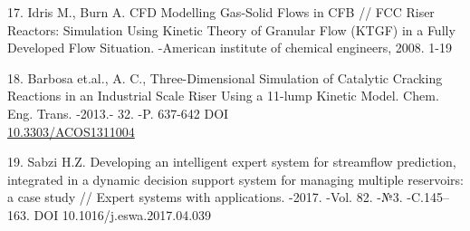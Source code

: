 \begin{references}
17. Idris M., Burn A. CFD Modelling Gas-Solid Flows in CFB // FCC Riser
Reactors: Simulation Using Kinetic Theory of Granular Flow (KTGF) in a
Fully Developed Flow Situation. -American institute of chemical
engineers, 2008. 1-19

18. Barbosa et.al., A. C., Three-Dimensional Simulation of Catalytic
Cracking Reactions in an Industrial Scale Riser Using a 11-lump Kinetic
Model. Chem. Eng. Trans. -2013.- 32. -P. 637-642 DOI
\\\href{http://dx.doi.org/10.3303/ACOS1311004}{10.3303/ACOS1311004}

19. Sabzi H.Z. Developing an intelligent expert system for streamflow
prediction, integrated in a dynamic decision support system for managing
multiple reservoirs: a case study // Expert systems with applications.
-2017. -Vol. 82. -№3. -C.145--163. DOI 10.1016/j.eswa.2017.04.039
\end{references}

